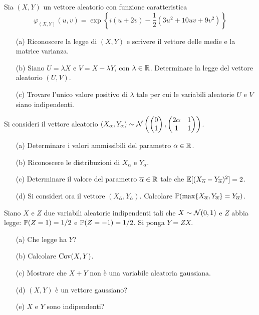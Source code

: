 \Esercizio{} %
Sia $(X,Y)$ un vettore aleatorio con funzione caratteristica
\[
\varphi_{(X,Y)}(u,v)=\exp\left\{i(u+2v)-\frac{1}{2}\left(3u^2+10uv+9v^2\right)  \right\}
\]
\begin{enumerate}
\item [(a)] Riconoscere la legge di $(X,Y)$ e scrivere il vettore delle medie e la matrice varianza.
\item [(b)] Siano $U=\lambda X$ e $V=X-\lambda Y$, con $\lambda\in\mathbb{R}$. Determinare la legge del vettore aleatorio $(U,V)$.
\item [(c)] Trovare l'unico valore positivo di $\lambda$ tale per cui le variabili aleatorie $U$ e $V$ siano indipendenti.
\end{enumerate}

\Esercizio{} %
Si consideri il vettore aleatorio $(X_\alpha,Y_\alpha)\sim\mathcal{N}\left(\begin{pmatrix}
0 \\1
\end{pmatrix},\begin{pmatrix}
2\alpha &1 \\1&1
\end{pmatrix}\right)$.
\begin{enumerate}
\item [(a)] Determinare i valori ammissibili del parametro $\alpha\in\mathbb{R}$.
\item [(b)] Riconoscere le distribuzioni di $X_\alpha$ e $Y_\alpha$.
\item [(c)] Determinare il valore del parametro $\overline{\alpha}\in\mathbb{R}$ tale che $\mathbb{E}[(X_{\overline{\alpha}}-Y_{\overline{\alpha}})^2]=2$.
\item [(d)] Si consideri ora il vettore $(X_{\overline{\alpha}},Y_{\overline{\alpha}})$. Calcolare $\mathbb{P}(\max\{X_{\overline{\alpha}},  Y_{\overline{\alpha}}\}=Y_{\overline{\alpha}})$. 
\end{enumerate}

\Esercizio{} %
Siano $X$ e $Z$ due variabili aleatorie indipendenti tali che $X\sim\mathcal{N}(0,1)$ e $Z$ abbia legge: $\mathbb{P}(Z=1)=1/2$ e $\mathbb{P}(Z=-1)=1/2$. Si ponga $Y=ZX$.
\begin{enumerate}
\item [(a)] Che legge ha $Y$?
\item [(b)] Calcolare $\operatorname{Cov}(X,Y)$.
\item [(c)] Mostrare che $X+Y$ non è una variabile aleatoria gaussiana.
\item [(d)] $(X,Y)$ è un vettore gaussiano?
\item [(e)] $X$ e $Y$ sono indipendenti?
\end{enumerate}

